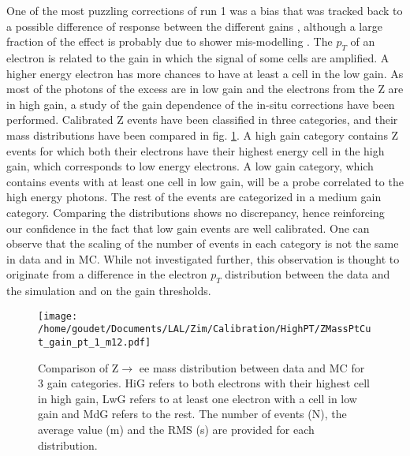 One of the most puzzling corrections of run 1 was a bias that was tracked back to a possible difference of response between the different gains \cite{CERN-THESIS-2015-193,ATL-COM-PHYS-2013-1655}, although a large fraction of the effect is probably due to shower mis-modelling \cite{ATL-COM-PHYS-2017-758,CERN-THESIS-2017-138}.
The $p_T$ of an electron is related to the gain in which the signal of some cells are amplified.
A higher energy electron has more chances to have at least a cell in the low gain.
As most of the photons of the excess are in low gain and the electrons from the Z are in high gain, a study of the gain dependence of the in-situ corrections have been performed.
Calibrated Z events have been classified in three categories, and their mass distributions have been compared in fig. \ref{fig:orgd958247}.
A high gain category contains Z events for which both their electrons have their highest energy cell in the high gain, which corresponds to low energy electrons.
A low gain category, which contains events with at least one cell in low gain, will be a probe correlated to the high energy photons.
The rest of the events are categorized in a medium gain category.
Comparing the distributions shows no discrepancy, hence reinforcing our confidence in the fact that low gain events are well calibrated.
One can observe that the scaling of the number of events in each category is not the same in data and in MC.
While not investigated further, this observation is thought to originate from a difference in the electron $p_T$ distribution between the data and the simulation and on the gain thresholds.

\begin{figure}[htbp]
\centering
\texttt{[image: /home/goudet/Documents/LAL/Zim/Calibration/HighPT/ZMassPtCut\_gain\_pt\_1\_m12.pdf]}
\caption{\label{fig:orgd958247}
Comparison of Z\(\rightarrow\) ee mass distribution between data and MC for 3 gain categories. HiG refers to both electrons with their highest cell in high gain, LwG refers to at least one electron with a cell in low gain and MdG refers to the rest. The number of events (N), the average value (m) and the RMS (s) are provided for each distribution.\cite{ATL-COM-PHYS-2016-184}}
\end{figure}


